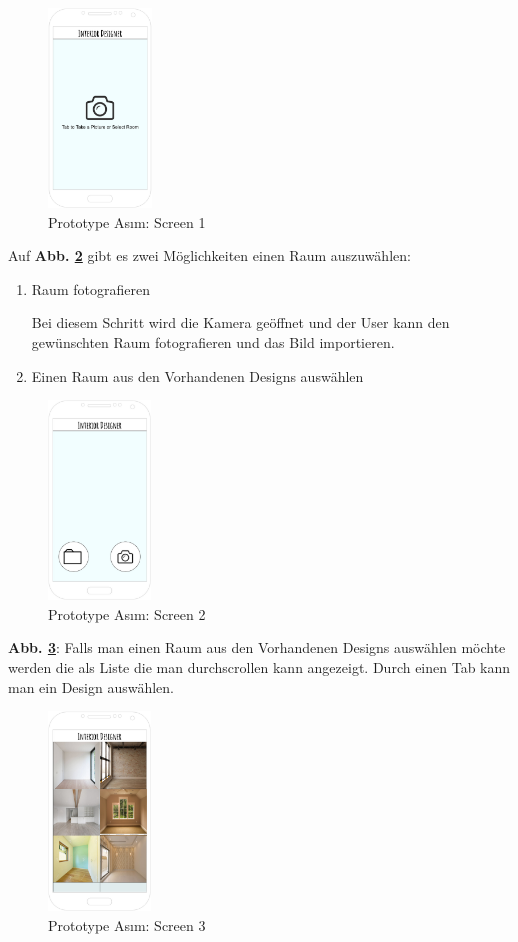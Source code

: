 \documentclass[12pt,paper=a4,oneside,hidelinks,headings=small,captions=heading,captions=nooneline]{scrartcl}
\begin{document}
\begin{figure}[htbp]
\centering
\includegraphics[height=200px]{./img/m2_lofi_asim_1.png}
\caption{\label{fig:lofi_asim_1}Prototype Asım: Screen 1}
\end{figure}

Auf \textbf{Abb. \ref{fig:lofi_asim_2}} gibt es zwei Möglichkeiten einen Raum auszuwählen:

\begin{enumerate}
\item Raum fotografieren

Bei diesem Schritt wird die Kamera geöffnet und
der User kann den gewünschten Raum
fotografieren und das Bild importieren.

\item Einen Raum aus den Vorhandenen Designs auswählen
\end{enumerate}

\begin{figure}[htbp]
\centering
\includegraphics[height=200px]{./img/m2_lofi_asim_2.png}
\caption{\label{fig:lofi_asim_2}Prototype Asım: Screen 2}
\end{figure}

\textbf{Abb. \ref{fig:lofi_asim_3}}: Falls man einen Raum aus den Vorhandenen
Designs auswählen möchte werden die als Liste die
man durchscrollen kann angezeigt. Durch einen Tab
kann man ein Design auswählen.

\begin{figure}[htbp]
\centering
\includegraphics[height=200px]{./img/m2_lofi_asim_3.png}
\caption{\label{fig:lofi_asim_3}Prototype Asım: Screen 3}
\end{figure}
\end{document}
